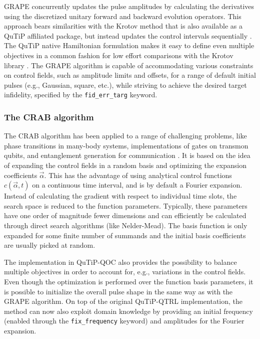 \documentclass[preprint,3p,sort&compress]{elsarticle}
\def\code#1{\texttt{#1}}
\begin{document}

GRAPE concurrently updates the pulse amplitudes by calculating the derivatives using the discretized unitary forward and backward evolution operators. 
This approach bears similarities with the Krotov method that is also available as a QuTiP affiliated package, but instead updates the control intervals sequentially \cite{Goerz_2019_SciPost}. 
The QuTiP native Hamiltonian formulation makes it easy to define even multiple objectives in a common fashion for low effort comparisons with the Krotov library \cite{Goerz_2019_SciPost,PhysRevA.107.032609}.
The GRAPE algorithm is capable of accommodating various constraints on control fields, such as amplitude limits and offsets, for a range of default initial pulses (e.g., Gaussian, square, etc.), while striving to achieve the desired target infidelity, specified by the \code{fid\_err\_targ} keyword.

\subsubsection{The CRAB algorithm}
The CRAB algorithm has been applied to a range of challenging problems, like phase transitions in many-body systems, implementations of gates on transmon qubits, and entanglement generation for communication \cite{M_ller_2022, corti_robustness_2022}.
It is based on the idea of expanding the control fields in a random basis and optimizing the expansion coefficients $\vec{\alpha}$.
This has the advantage of using analytical control functions $c(\vec{\alpha}, t)$ on a continuous time interval, and is by default a Fourier expansion.
Instead of calculating the gradient with respect to individual time slots, the search space is reduced to the function parameters.
Typically, these parameters have one order of magnitude fewer dimensions and can efficiently be calculated through direct search algorithms (like Nelder-Mead).
The basis function is only expanded for some finite number of summands and the initial basis coefficients are usually picked at random.

The implementation in QuTiP-QOC also provides the possibility to balance multiple objectives in order to account for, e.g., variations in the control fields. Even though the optimization is performed over the function basis parameters, it is possible to initialize the overall pulse shape in the same way as with the GRAPE algorithm. 
On top of the original QuTiP-QTRL implementation, the method can now also exploit domain knowledge by providing an initial frequency (enabled through the \code{fix\_frequency} keyword) and amplitudes for the Fourier expansion.
\newpage
{}
\end{document}
